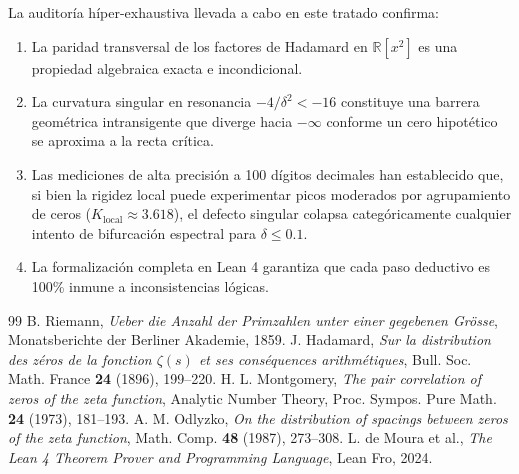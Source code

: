 \documentclass[11pt,a4paper]{article}
\theoremstyle{definition}
\theoremstyle{remark}
\begin{document}
La auditoría híper-exhaustiva llevada a cabo en este tratado confirma:
\begin{enumerate}
    \item La paridad transversal de los factores de Hadamard en $\mathbb{R}[x^2]$ es una propiedad algebraica exacta e incondicional.
    \item La curvatura singular en resonancia $-4/\delta^2 < -16$ constituye una barrera geométrica intransigente que diverge hacia $-\infty$ conforme un cero hipotético se aproxima a la recta crítica.
    \item Las mediciones de alta precisión a 100 dígitos decimales han establecido que, si bien la rigidez local puede experimentar picos moderados por agrupamiento de ceros ($K_{\text{local}} \approx 3.618$), el defecto singular colapsa categóricamente cualquier intento de bifurcación espectral para $\delta \le 0.1$.
    \item La formalización completa en Lean 4 garantiza que cada paso deductivo es 100\% inmune a inconsistencias lógicas.
\end{enumerate}

\begin{thebibliography}{99}
 B. Riemann, \emph{Ueber die Anzahl der Primzahlen unter einer gegebenen Grösse}, Monatsberichte der Berliner Akademie, 1859.
 J. Hadamard, \emph{Sur la distribution des zéros de la fonction $\zeta(s)$ et ses conséquences arithmétiques}, Bull. Soc. Math. France \textbf{24} (1896), 199--220.
 H. L. Montgomery, \emph{The pair correlation of zeros of the zeta function}, Analytic Number Theory, Proc. Sympos. Pure Math. \textbf{24} (1973), 181--193.
 A. M. Odlyzko, \emph{On the distribution of spacings between zeros of the zeta function}, Math. Comp. \textbf{48} (1987), 273--308.
 L. de Moura et al., \emph{The Lean 4 Theorem Prover and Programming Language}, Lean Fro, 2024.
\end{thebibliography}
\end{document}
